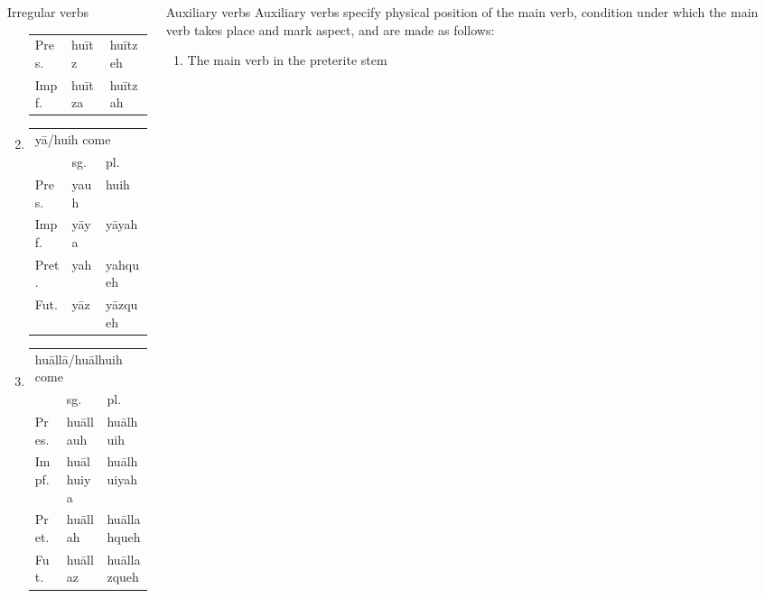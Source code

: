 \documentclass[12pt]{beamer}
\newcommand{\nah}[1]{\textcolor{nahgrn}{#1}}
\newcommand{\trs}[1]{\textcolor{nahblu}{#1}}
\begin{document}
\begin{frame}
\begin{columns}[t]
\begin{column}{.18\linewidth}
\begin{block}{Irregular verbs}
\begin{enumerate}
\begin{tabular}[t]{lll}
                  Pres. & \nah{huītz}  & \nah{huītzeh}      \\
                  Impf. & \nah{huītza} & \nah{huītzah}      \\
                \end{tabular}%
          \item \begin{tabular}[t]{lll}
                  \multicolumn{3}{l}{\nah{yā/huih} \trs{come}} \\
                        & sg.        & pl.                     \\
                  Pres. & \nah{yauh} & \nah{huih}              \\
                  Impf. & \nah{yāya} & \nah{yāyah}             \\
                  Pret. & \nah{yah}  & \nah{yahqueh}           \\
                  Fut.  & \nah{yāz}  & \nah{yāzqueh}           \\
                \end{tabular}%
          \item \begin{tabular}[t]{lll}
                  \multicolumn{3}{l}{\nah{huāllā/huālhuih} \trs{come}} \\
                        & sg.             & pl.                        \\
                  Pres. & \nah{huāllauh}  & \nah{huālhuih}             \\
                  Impf. & \nah{huālhuiya} & \nah{huālhuiyah}           \\
                  Pret. & \nah{huāllah}   & \nah{huāllahqueh}          \\
                  Fut.  & \nah{huāllaz}   & \nah{huāllazqueh}          \\
                \end{tabular}%
        \end{enumerate}
      \end{block}
    \end{column}
    \begin{column}{.18\linewidth}
      \begin{block}{Auxiliary verbs}
        Auxiliary verbs specify physical position of the main verb, condition under which the main verb takes place and mark aspect, and are made as follows:
        \begin{enumerate}
          \item The main verb in the preterite stem

\end{enumerate}
\end{block}
\end{column}
\end{columns}
\end{frame}
\end{document}
